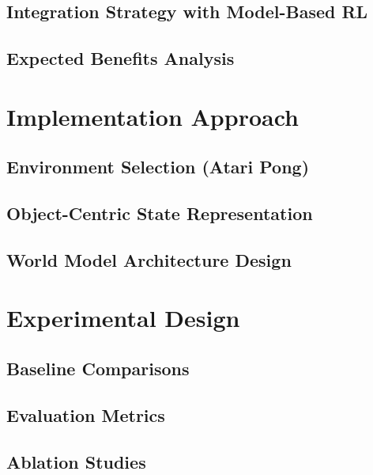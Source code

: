 \documentclass[
	english,
	ruledheaders=section,
	class=report,
	thesis={type=master},
	accentcolor=9c,
	custommargins=true,
	marginpar=false,
	parskip=half-,
	fontsize=11pt,
]{tudapub}
\begin{document}
\subsection{Integration Strategy with Model-Based RL}
\label{subsec:integration_strategy}

\subsection{Expected Benefits Analysis}
\label{subsec:benefits_analysis}

\section{Implementation Approach}
\label{sec:implementation_approach}

\subsection{Environment Selection (Atari Pong)}
\label{subsec:env_selection}

\subsection{Object-Centric State Representation}
\label{subsec:state_representation}

\subsection{World Model Architecture Design}
\label{subsec:architecture_design}

\section{Experimental Design}
\label{sec:experimental_design}

\subsection{Baseline Comparisons}
\label{subsec:baselines}

\subsection{Evaluation Metrics}
\label{subsec:metrics}

\subsection{Ablation Studies}
\label{subsec:ablation}
\end{document}
